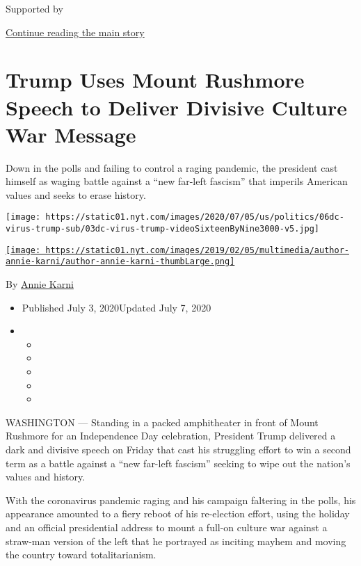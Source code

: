 Supported by

\protect\hyperlink{after-sponsor}{Continue reading the main story}

\hypertarget{trump-uses-mount-rushmore-speech-to-deliver-divisive-culture-war-message}{%
\section{Trump Uses Mount Rushmore Speech to Deliver Divisive Culture
War
Message}\label{trump-uses-mount-rushmore-speech-to-deliver-divisive-culture-war-message}}

Down in the polls and failing to control a raging pandemic, the
president cast himself as waging battle against a ``new far-left
fascism'' that imperils American values and seeks to erase history.

\texttt{[image: https://static01.nyt.com/images/2020/07/05/us/politics/06dc-virus-trump-sub/03dc-virus-trump-videoSixteenByNine3000-v5.jpg]}

\href{https://www.nytimes.com/by/annie-karni}{\texttt{[image: https://static01.nyt.com/images/2019/02/05/multimedia/author-annie-karni/author-annie-karni-thumbLarge.png]}}

By \href{https://www.nytimes.com/by/annie-karni}{Annie Karni}

\begin{itemize}
\item
  Published July 3, 2020Updated July 7, 2020
\item
  \begin{itemize}
  \item
  \item
  \item
  \item
  \item
  \end{itemize}
\end{itemize}

WASHINGTON --- Standing in a packed amphitheater in front of Mount
Rushmore for an Independence Day celebration, President Trump delivered
a dark and divisive speech on Friday that cast his struggling effort to
win a second term as a battle against a ``new far-left fascism'' seeking
to wipe out the nation's values and history.

With the coronavirus pandemic raging and his campaign faltering in the
polls, his appearance amounted to a fiery reboot of his re-election
effort, using the holiday and an official presidential address to mount
a full-on culture war against a straw-man version of the left that he
portrayed as inciting mayhem and moving the country toward
totalitarianism.

